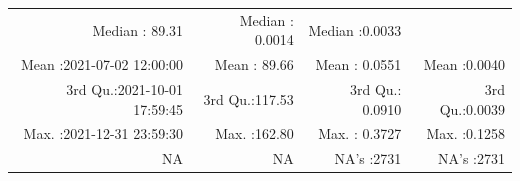 \documentclass[
  10pt,
  a4paper,oneside]{article}
\begin{document}
\begin{longtable}[]{@{}rrrr@{}}
\begin{minipage}[t]{0.18\columnwidth}
Median : 89.31\strut
\end{minipage} & \begin{minipage}[t]{0.19\columnwidth}\raggedleft
Median : 0.0014\strut
\end{minipage} & \begin{minipage}[t]{0.19\columnwidth}\raggedleft
Median :0.0033\strut
\end{minipage}\tabularnewline
\begin{minipage}[t]{0.32\columnwidth}\raggedleft
Mean :2021-07-02 12:00:00\strut
\end{minipage} & \begin{minipage}[t]{0.18\columnwidth}\raggedleft
Mean : 89.66\strut
\end{minipage} & \begin{minipage}[t]{0.19\columnwidth}\raggedleft
Mean : 0.0551\strut
\end{minipage} & \begin{minipage}[t]{0.19\columnwidth}\raggedleft
Mean :0.0040\strut
\end{minipage}\tabularnewline
\begin{minipage}[t]{0.32\columnwidth}\raggedleft
3rd Qu.:2021-10-01 17:59:45\strut
\end{minipage} & \begin{minipage}[t]{0.18\columnwidth}\raggedleft
3rd Qu.:117.53\strut
\end{minipage} & \begin{minipage}[t]{0.19\columnwidth}\raggedleft
3rd Qu.: 0.0910\strut
\end{minipage} & \begin{minipage}[t]{0.19\columnwidth}\raggedleft
3rd Qu.:0.0039\strut
\end{minipage}\tabularnewline
\begin{minipage}[t]{0.32\columnwidth}\raggedleft
Max. :2021-12-31 23:59:30\strut
\end{minipage} & \begin{minipage}[t]{0.18\columnwidth}\raggedleft
Max. :162.80\strut
\end{minipage} & \begin{minipage}[t]{0.19\columnwidth}\raggedleft
Max. : 0.3727\strut
\end{minipage} & \begin{minipage}[t]{0.19\columnwidth}\raggedleft
Max. :0.1258\strut
\end{minipage}\tabularnewline
\begin{minipage}[t]{0.32\columnwidth}\raggedleft
NA\strut
\end{minipage} & \begin{minipage}[t]{0.18\columnwidth}\raggedleft
NA\strut
\end{minipage} & \begin{minipage}[t]{0.19\columnwidth}\raggedleft
NA's :2731\strut
\end{minipage} & \begin{minipage}[t]{0.19\columnwidth}\raggedleft
NA's :2731\strut
\end{minipage}\tabularnewline
\bottomrule
\end{longtable}
\end{document}
